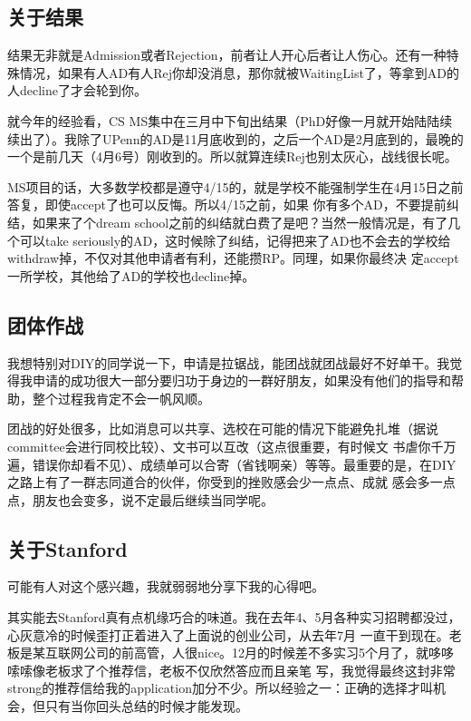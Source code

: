 \subsection{关于结果}

结果无非就是Admission或者Rejection，前者让人开心后者让人伤心。还有一种特殊情况，如果有人AD有人Rej你却没消息，那你就被WaitingList了，等拿到AD的人decline了才会轮到你。\par

就今年的经验看，CS MS集中在三月中下旬出结果（PhD好像一月就开始陆陆续续出了）。我除了UPenn的AD是11月底收到的，之后一个AD是2月底到的，最晚的一个是前几天（4月6号）刚收到的。所以就算连续Rej也别太灰心，战线很长呢。\par

MS项目的话，大多数学校都是遵守4/15的，就是学校不能强制学生在4月15日之前答复，即使accept了也可以反悔。所以4/15之前，如果 你有多个AD，不要提前纠结，如果来了个dream school之前的纠结就白费了是吧？当然一般情况是，有了几个可以take seriously的AD，这时候除了纠结，记得把来了AD也不会去的学校给withdraw掉，不仅对其他申请者有利，还能攒RP。同理，如果你最终决 定accept一所学校，其他给了AD的学校也decline掉。\par

\subsection{团体作战}

我想特别对DIY的同学说一下，申请是拉锯战，能团战就团战最好不好单干。我觉得我申请的成功很大一部分要归功于身边的一群好朋友，如果没有他们的指导和帮助，整个过程我肯定不会一帆风顺。\par

团战的好处很多，比如消息可以共享、选校在可能的情况下能避免扎堆（据说committee会进行同校比较）、文书可以互改（这点很重要，有时候文 书虐你千万遍，错误你却看不见）、成绩单可以合寄（省钱啊亲）等等。最重要的是，在DIY之路上有了一群志同道合的伙伴，你受到的挫败感会少一点点、成就 感会多一点点，朋友也会变多，说不定最后继续当同学呢。\par

\subsection{关于Stanford}

可能有人对这个感兴趣，我就弱弱地分享下我的心得吧。\par

其实能去Stanford真有点机缘巧合的味道。我在去年4、5月各种实习招聘都没过，心灰意冷的时候歪打正着进入了上面说的创业公司，从去年7月 一直干到现在。老板是某互联网公司的前高管，人很nice。12月的时候差不多实习5个月了，就哆哆嗦嗦像老板求了个推荐信，老板不仅欣然答应而且亲笔 写，我觉得最终这封非常strong的推荐信给我的application加分不少。所以经验之一：正确的选择才叫机会，但只有当你回头总结的时候才能发现。\par

